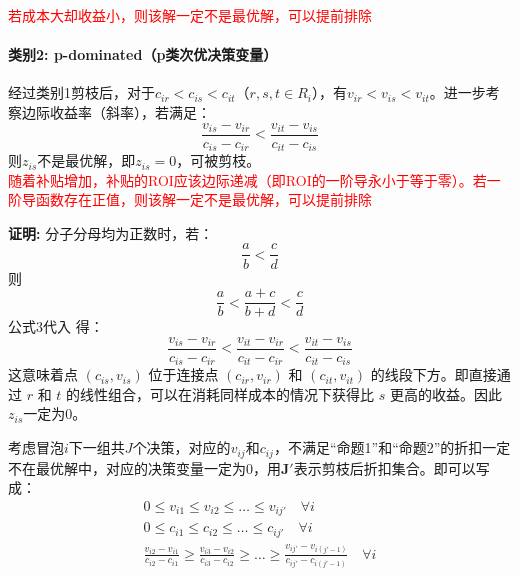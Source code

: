 \textcolor{red}{若成本大却收益小，则该解一定不是最优解，可以提前排除}

\paragraph{类别2: p-dominated（p类次优决策变量）}
经过类别1剪枝后，对于$c_{ir} < c_{is} < c_{it}$（$r, s, t \in R_i$），有$v_{ir} < v_{is} < v_{it}$。进一步考察边际收益率（斜率），若满足：
\begin{equation}
\frac{v_{is} - v_{ir}}{c_{is} - c_{ir}} < \frac{v_{it} - v_{is}}{c_{it} - c_{is}}
\end{equation}
则$z_{is}$不是最优解，即$z_{is}=0$，可被剪枝。
\\

\textcolor{red}{随着补贴增加，补贴的ROI应该边际递减（即ROI的一阶导永小于等于零）。若一阶导函数存在正值，则该解一定不是最优解，可以提前排除}

\textbf{证明\citep{sinha1979multiple}:}
分子分母均为正数时，若：
\begin{equation}
\frac{a}{b}<\frac{c}{d}
\end{equation}
则
\begin{equation}
\frac{a}{b}<\frac{a+c}{b+d}<\frac{c}{d}
\end{equation}
公式3代入
得：
\begin{equation}
\frac{v_{is} - v_{ir}}{c_{is} - c_{ir}} <\frac{v_{it} - v_{ir}}{c_{it} - c_{ir}}< \frac{v_{it} - v_{is}}{c_{it} - c_{is}}
\end{equation}
这意味着点 $(c_{is}, v_{is})$ 位于连接点 $(c_{ir}, v_{ir})$ 和 $(c_{it}, v_{it})$ 的线段下方。即直接通过 $r$ 和 $t$ 的线性组合，可以在消耗同样成本的情况下获得比 $s$ 更高的收益。因此$z_{is}$一定为0。
\par
考虑冒泡$i$下一组共$J$个决策，对应的$v_{ij}$和$c_{ij}$，不满足“命题1”和“命题2”的折扣一定不在最优解中，对应的决策变量一定为0，用$\bm{J'}$表示剪枝后折扣集合。即可以写成：
\begin{equation}
\begin{aligned}
0 \leq v_{i1} \leq v_{i2} \leq \dots \leq v_{ij'}\quad \forall i\\
0 \leq c_{i1} \leq c_{i2} \leq \dots \leq c_{ij'} \quad \forall i\\
 \frac{v_{i2} - v_{i1}}{c_{i2} - c_{i1}} \geq \frac{v_{i3} - v_{i2}}{c_{i3} - c_{i2}} \geq \dots \geq \frac{v_{ij'} - v_{i(j'-1)}}{c_{ij'} - c_{i(j'-1)}} \quad \forall i
\end{aligned}
\end{equation}


